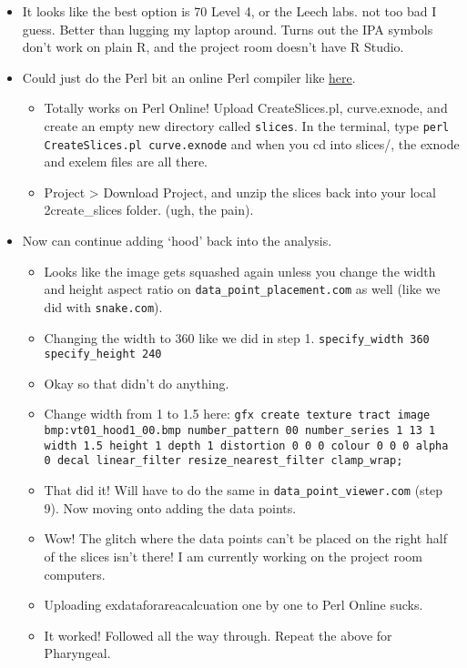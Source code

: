 \documentclass{article}
\begin{document}
\begin{itemize}
    \item It looks like the best option is 70 Level 4, or the Leech labs. not too bad I guess. Better than lugging my laptop around. Turns out the IPA symbols don't work on plain R, and the project room doesn't have R Studio.
    \item Could just do the Perl bit an online Perl compiler like \href{http://www.tutorialspoint.com/execute_perl_online.php}{here}. 
    \begin{itemize}
        \item Totally works on Perl Online! Upload CreateSlices.pl, curve.exnode, and create an empty new directory called \verb|slices|. In the terminal, type \verb|perl CreateSlices.pl curve.exnode| and when you cd into slices/, the exnode and exelem files are all there.
        \item Project > Download Project, and unzip the slices back into your local 2create\_slices folder. (ugh, the pain).
    \end{itemize}
    \item Now can continue adding `hood' back into the analysis.
    \begin{itemize}
        \item Looks like the image gets squashed again unless you change the width and height aspect ratio on \verb|data_point_placement.com| as well (like we did with \verb|snake.com|).
        \item Changing the width to 360 like we did in step 1. \verb|specify_width 360 specify_height 240|
        \item Okay so that didn't do anything.
        \item Change width from 1 to 1.5 here: \verb|gfx create texture tract image bmp:vt01_hood1_00.bmp number_pattern 00 number_series 1 13 1 width 1.5 height 1 depth 1 distortion 0 0 0 colour 0 0 0 alpha 0 decal linear_filter resize_nearest_filter clamp_wrap;|
        \item That did it! Will have to do the same in \verb|data_point_viewer.com| (step 9). Now moving onto adding the data points.
        \item Wow! The glitch where the data points can't be placed on the right half of the slices isn't there! I am currently working on the project room computers.
        \item Uploading exdataforareacalcuation one by one to Perl Online sucks.
        \item It worked! Followed all the way through. Repeat the above for Pharyngeal.

\end{itemize}
\end{itemize}
\end{document}
